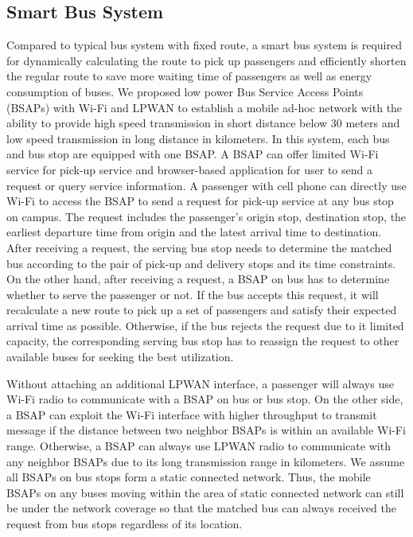 \documentclass[runningheads]{llncs}
\begin{document}
\subsection{Smart Bus System}
Compared to typical bus system with fixed route, a smart bus system is required for dynamically calculating the route to pick up passengers and efficiently shorten the regular route to save more waiting time of passengers as well as energy consumption of buses. We proposed low power Bus Service Access Points (BSAPs) with Wi-Fi and LPWAN to establish a mobile ad-hoc network with the ability to provide high speed transmission in short distance below 30 meters and low speed transmission in long distance in kilometers.
In this system, each bus and bus stop are equipped with one BSAP. A BSAP can offer limited Wi-Fi service for pick-up service and browser-based application for user to send a request or query service information. A passenger with cell phone can directly use Wi-Fi to access the BSAP to send a request for pick-up service at any bus stop on campus. The request includes the passenger’s origin stop, destination stop, the earliest departure time from origin and the latest arrival time to destination. After receiving a request, the serving bus stop needs to determine the matched bus according to the pair of pick-up and delivery stops and its time constraints. On the other hand, after receiving a request, a BSAP on bus has to determine whether to serve the passenger or not. If the bus accepts this request, it will recalculate a new route to pick up a set of passengers and satisfy their expected arrival time as possible. Otherwise, if the bus rejects the request due to it limited capacity, the corresponding serving bus stop has to reassign the request to other available buses for seeking the best utilization.

Without attaching an additional LPWAN interface, a passenger will always use Wi-Fi radio to communicate with a BSAP on bus or bus stop. On the other side, a BSAP can exploit the Wi-Fi interface with higher throughput to transmit message if the distance between two neighbor BSAPs is within an available Wi-Fi range. Otherwise, a BSAP can always use LPWAN radio to communicate with any neighbor BSAPs due to its long transmission range in kilometers. We assume all BSAPs on bus stops form a static connected network. Thus, the mobile BSAPs on any buses moving within the area of static connected network can still be under the network coverage so that the matched bus can always received the request from bus stops regardless of its location.
\end{document}
